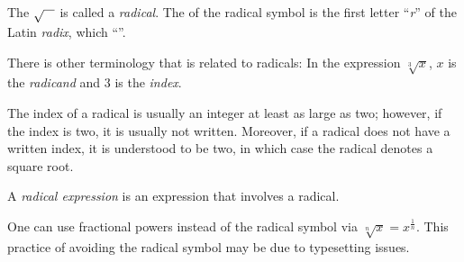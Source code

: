 \documentclass[12pt]{article}
\begin{document}
The \; $\sqrt{\hspace{3mm}}$\; is called a \emph{radical}.  The  of the radical symbol is the first letter ``{\em r}'' of the Latin  {\em radix}, which  ``''.

There is other terminology that is related to radicals:  In the expression $\sqrt[3]{x}$, $x$ is the \emph{radicand} and $3$ is the \emph{index}.

The index of a radical is usually an integer at least as large as two; however, if the index is two, it is usually not written.  Moreover, if a radical does not have a written index, it is understood to be two, in which case the radical denotes a square root.

A \emph{radical expression} is an expression that involves a radical.

One can use fractional powers instead of the radical symbol via $\sqrt[n]{x} = x^{\frac{1}{n}}$.  This practice of avoiding the radical symbol may be  due to typesetting issues.
\end{document}
